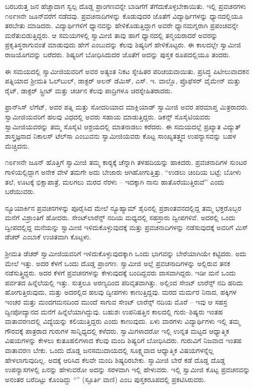  ಬರಬರುತ್ತ ಜನ ಹೆಚ್ಚಾದಾಗ ಸ್ವಲ್ಪ ದೊಡ್ಡ ಪ್ರಾಂಗಣವನ್ನೇ ಬಾಡಿಗೆಗೆ ತೆಗೆದುಕೊಳ್ಳಬೇಕಾಯಿತು. ಇಲ್ಲಿ ಪ್ರವಚನಗಳು ೧೮೯೫ನೇ ಜೂನ್‍ವರೆಗೆ ನಡೆದವು. ಪ್ರವಚನಾದಿಗಳನ್ನು ಕೊಡುವುದರ ಜೊತೆಗೆ ವಿದ್ಯಾರ್ಥಿಗಳನ್ನು ಧ್ಯಾನದಲ್ಲಿಯೂ ತರಬೇತು ಮಾಡಿದರು. ವಿದ್ಯಾರ್ಥಿಗಳಿಗೆ ಧ್ಯಾನವನ್ನು ಹೇಳಿಕೊಡುತ್ತಿದ್ದಾಗ ಅವರೇ ಧ್ಯಾನಮಗ್ನರಾಗಿ ಪ್ರಪಂಚವನ್ನೇ ಮರೆತುಬಿಡುತ್ತಿದ್ದರು. ಆ ಸಮಯಗಳಲ್ಲಿ ಸ್ವಾಮೀಜಿ ತಾವು ಹಾಗೆ ಧ್ಯಾನದಲ್ಲಿ ತನ್ಮಯರಾದರೆ ಅವರನ್ನು ಪ್ರಕೃತಿಸ್ಥರಾಗುವಂತೆ ಮಾಡುವುದು ಹೇಗೆ ಎಂಬುದನ್ನು ಕೆಲವು ಶಿಷ್ಯರಿಗೆ ಹೇಳಿಕೊಟ್ಟರು. ಈ ಕಾಲದಲ್ಲೇ ಸ್ವಾಮೀಜಿ ರಾಜಯೊಗವನ್ನು ಬರೆದರು. ಶಿಷ್ಯರಿಗೆ ಬೋಧಿಸಿದುದರ ಜೊತೆಗೆ ಅದನ್ನು ಪುಸ್ತಕ ರೂಪದಲ್ಲಿಯೂ ತಂದರು. 

 ಈ ಸಮಯದಲ್ಲಿ ಸ್ವಾಮೀಜಿಯವರಿಗೆ ಅವರ ಅತ್ಯಂತ ನಿಕಟ ಸ್ನೇಹಿತರ ಪರಿಚಯವಾಯಿತು. ಪ್ರಸಿದ್ಧ ಪಿಟೀಲುವಾದಕನ ಪತ್ನಿಯಾದ ಶ‍್ರೀಮತಿ ಓಲ್‍ಬುಲ್, ಡಾಕ್ಟರ್ ಅಲನ್ ಡೆಮಿಸ್, ಎಸ್. ಇ. ವಾಲ್ಡೊ, ಪ್ರೊಫೆಸರ್ ವೈಮೇನ್ ಮತ್ತು ರೈಟ್, ಡಾಕ್ಟರ್ ಸ್ಟ್ರೀಟ್ ಮತ್ತು ಚರ್ಚಿನ ಕೆಲವು ಪಾದ್ರಿಗಳೂ ಚಿರಸ್ನೇಹಿತರಾದರು. 

 ಫ್ರಾನ್‍ಸಿಸ್ ಲೆಗೆಟ್, ಅವರ ಪತ್ನಿ ಮತ್ತು ಸೋದರಿಯಾದ ಮಾಕ್ಲಿಯಾಡ್ ಸ್ವಾಮೀಜಿ ಅವರ ಪರಮಾಪ್ತ ಮಿತ್ರರಾದರು. ಸ್ವಾಮೀಜಿಯವರಿಗೆ ಹಲವು ವಿಧದಲ್ಲಿ ಅವರು ಸಹಾಯ ಮಾಡುತ್ತಿದ್ದರು. ಡಿಕನ್ಸ್ ಸೊಸೈಟಿಯವರು ಸ್ವಾಮೀಜಿಯವರನ್ನು ತಮ್ಮ ಸೊಸೈಟಿ ಆಶ್ರಯದಲ್ಲಿ ಮಾತನಾಡಲು ಕರೆದರು. ಈ ಸಮಯದಲ್ಲೆ ಪ್ರಖ್ಯಾತ ವಿದ್ಯುತ್ ಶಾಸ್ತ್ರಜ್ಞನಾದ ನಿಕಾಲಸ್ ಟೆಲ್‍ಸಾ ಎಂಬುವನು ಸ್ವಾಮೀಜಿಯವರು ಕೊಟ್ಟ ಸಾಂಖ್ಯತತ್ತ್ವದ ಉಪನ್ಯಾಸವನ್ನು ಬಹಳ ಮೆಚ್ಚಿದನು. 

 ೧೮೯೫ನೇ ಜೂನ್ ಹೊತ್ತಿಗೆ ಸ್ವಾಮೀಜಿ ತಮ್ಮ ಕಾರ‍್ಯಕ್ಕೆ ಚೆನ್ನಾಗಿ ತಳಹದಿಯನ್ನು ಹಾಕಿದರು. ಪ್ರವಚನಾದಿಗಳ ಸುಂಟರ ಗಾಳಿಯಲ್ಲಿದ್ದಾಗ ಅನೇಕ ವೇಳೆ ತಮಗೇ ಅದು ಬೇಜಾರು ಆಗಿಹೋಗುತ್ತಿತ್ತು. “ಉಡಲು ಚಿಂದಿಯ ಬಟ್ಟೆ; ಬೋಳು ತಲೆ, ಊಟಕ್ಕೆ ಭಿಕ್ಷಾಪಾತ್ರೆ, ಮಲಗಲು ಮರದ ನೆರಳು – ಇದಕ್ಕಾಗಿ ನಾನು ಹಾತೊರೆಯುತ್ತಿರುವೆ” ಎಂದು ಬರೆಯುವರು. 

 ನ್ಯೂಯಾರ್ಕಿನ ಪ್ರವಚನಗಳನ್ನು ಪೂರೈಸಿದ ಮೇಲೆ ನ್ಯೂಹ್ಯಾಮ್ ಶೈರಿನಲ್ಲಿ ಪ್ರಶಾಂತವನದಲ್ಲಿದ್ದ ತಮ್ಮ ಭಕ್ತರೊಬ್ಬರ ಮನೆಗೆ ವಿಶ್ರಾಂತಿಗೆ ಹೋದರು. ಸೇಂಟ್‍ಲಾರೆನ್ಸ್ ನದಿಯ ಮಧ್ಯದಲ್ಲಿ ಸಹಸ್ರಾರು ದ್ವೀಪಗಳಿವೆ. ಅದರಲ್ಲಿ ಒಂದು ದ್ವೀಪದಲ್ಲಿದ್ದ ಮನೆಯನ್ನು ಸ್ವಾಮೀಜಿ ಇಳಿದುಕೊಳ್ಳುವುದಕ್ಕೆ ಮತ್ತು ಪ್ರವಚನಾದಿಗಳನ್ನು ನಡೆಸುವುದಕ್ಕೆ ಅವರಿಗೆ ಮಿಸ್ ಡೆಚರ್ ಎಂಬಾಕೆ ಉಚಿತವಾಗಿ ಕೊಟ್ಟಳು. 

 ಶ‍್ರೀಮತಿ ಡೆಚರ್ ಸ್ವಾಮೀಜಿಯವರಿಗೆ ಇಳಿದುಕೊಳ್ಳುವುದಕ್ಕಾಗಿ ಒಂದು ಭಾಗವನ್ನು ಬೇರೆಯಾಗಿಯೇ ಕಟ್ಟಿದರು. ಅದು ಮೇಲೆ ಇತ್ತು. ಅದರ ಕೆಳಗೆ ಒಂದು ದೊಡ್ಡ ಪ್ರಾಂಗಣ. ಸ್ವಾಮೀಜಿ ಅಲ್ಲೆ ಪ್ರವಚನಾದಿಗಳನ್ನು ಅಲ್ಲಿರುವ ತನಕ ನಡೆಸುತ್ತ್ತಿದ್ದರು. ಅದರ ಕೆಳಗೆ ಪ್ರವಚನಗಳನ್ನು ಕೇಳುವುದಕ್ಕೆ ಬಂದಿದ್ದವರು ವಾಸವಾಗಿದ್ದರು. ಇಡೀ ಮನೆ ಒಂದು ಪರ್ವತದ ಹಿನ್ನೆಲೆಯಲ್ಲಿ ಇತ್ತು. ಸುತ್ತಲೂ ಅರಣ್ಯದಿಂದ ಪರಿವೃತವಾಗಿತ್ತು. ಅಲ್ಲಿಂದ ಸೇಂಟ್ ಲಾರೆನ್ಸ್ ನದಿ ಹರಿದು ಹೋಗುತ್ತಿರುವುದು, ಮತ್ತು ಅದರಲ್ಲಿದ ಹಲವು ದ್ವೀಪಗಳು ಕಾಣುತ್ತಿದ್ದವು. ಮರದ ಮರ್ಮರ ನಿನಾದ, ಹಕ್ಕಿಗಳ ಇಂಚರ ಮತ್ತು ಮಂದಗಮನದಿಂದ ಮುಂದೆ ಸಾಗುವ ಸೇಂಟ್ ಲಾರೆನ್ಸ್ ನದಿಯ ಮೊರೆ – ಇವು ಆ ಸಹಸ್ರ ದ್ವೀಪೋದ್ಯಾನದ ಮನೆಗೆ ಹಿನ್ನೆಲೆಯಾಗಿದ್ದುವು. ಬಹುಶಃ ಉಪನಿಷತ್ತಿನ ಕಾಲದಲ್ಲಿ ಗುರು–ಶಿಷ್ಯರು ಇಂತಹ ವಾತಾವರಣದಲ್ಲಿ ವಿದ್ಯೆಯನ್ನು ಕಲಿಯುತ್ತಿದ್ದರು ಎಂದು ಕಾಣುವುದು. ಏಳು ವಾರಗಳು ವಿದ್ಯಾರ್ಥಿಗಳು ಇಲ್ಲಿ ತಮ್ಮ ಗೌರವಕ್ಕೆ ಪಾತ್ರರಾದ ಗುರುಗಳ ಸಾನ್ನಿಧ್ಯದಲ್ಲಿ ಕಳೆದರು. ಸ್ವಾಮಿಗಳಾದರೋ ಇಲ್ಲಿ ಉನ್ನತ ಮಟ್ಟದ ಆಧ್ಯಾತ್ಮಿಕ ವಿಷಯಗಳನ್ನು ಕೇಳಲು ಕುತೂಹಲಿಗಳಾದ ಕೆಲವು ಮಂದಿ ಶಿಷ್ಯರಿಗೆ ಬೋಧಿಸಿದರು. ಗುರುವಿಗೆ ನಿಜವಾದ ಇಂತಹ ವಾತಾವರಣ ಬೇಕು. ಒಂದು ದೊಡ್ಡ ಜನಸಮುದಾಯದಲ್ಲಿ ಸೂಕ್ಷ್ಮವಾದ ಆಧ್ಯಾತ್ಮಿಕ ವಿಷಯಗಳನ್ನೆಲ್ಲ ಹೇಳಲಾಗುವುದಿಲ್ಲ. ಅದಕ್ಕೆ ಆರಿಸಿದ ಕೆಲವೇ ಮಂದಿ ಶಿಷ್ಯರಿರಬೇಕು. ಸ್ವಾಮೀಜಿ ಬೇರೆ ಕಡೆ ದೊಡ್ಡ ದೊಡ್ಡ ಉಪನ್ಯಾಸಗಳಲ್ಲಿ ಏನನ್ನು ಹೇಳುವರೋ ಅದನ್ನು ಸರಳವಾಗಿ ಇಲ್ಲಿ ಹೇಳುವರು. ಇಲ್ಲಿ ಸ್ವಾಮೀಜಿ ಕೊಟ್ಟ ಪ್ರವಚನವನ್ನು ಅನಂತರ ಬರೆದಿಟ್ಟು ಕೊಂಡಿದ್ದು “” (ಸ್ಫೂರ್ತಿ ವಾಣಿ) ಎಂಬ ಪುಸ್ತಕರೂಪದಲ್ಲಿ ಪ್ರಕಟಿಸಿರುವರು. 

